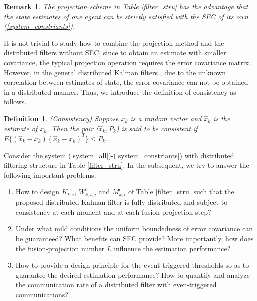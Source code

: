 \documentclass[journal,transmag]{IEEEtran}
\newtheorem{definition}{\textbf{Definition}}
\newtheorem{remark}{\textbf{Remark}}
\begin{document}
	

	\begin{remark}
		The projection scheme in Table \ref{filter_stru}  has the advantage that the state estimates of one agent can be
		strictly satisfied with the SEC of its own (\ref{system_constriants}). 
	\end{remark}
	


		It is not trivial to study how to combine the projection method and the distributed filters without SEC, since to obtain an estimate with smaller covariance, the typical projection operation requires the error covariance matrix. 	However, in the general distributed Kalman filters \cite{olfati2009kalman,olfati2007distributed, yang2014stochastic, Dm2015Distributed, cattivelli2010diffusion, Hu2012Diffusion}, due to the unknown correlation between estimates of state,  the error covariance can not be obtained in a distributed manner.  
	Thus, we introduce the definition of consistency  as follows.
	\begin{definition}\cite{Julier1997A}\label{def_consis}
		(Consistency) Suppose $x_{k}$ is a random vector and $\hat x_{k}$ is the estimate of $x_{k}$. Then the pair ($\hat x_{k},P_{k}$) is said to be consistent  if $E\{(\hat x_{k}-x_{k})(\hat x_{k}- x_{k})^T\}\leq P_{k}.$
	\end{definition}
	 
	Consider the system (\ref{system_all})-(\ref{system_constriants}) with distributed filtering structure in Table \ref{filter_stru}.
	 In the subsequent, we try to answer the following important problems:
	\begin{enumerate}
		\item How to design $K_{k,i}$, $W_{k,i,j}^l$ and $M_{k,i}^l$ of Table \ref{filter_stru} such that the proposed distributed Kalman filter is fully distributed  and subject to consistency at each moment and at each fusion-projection step?
		\item Under what mild conditions the uniform boundedness of error covariance can be guaranteed?		
		What benefits can SEC  provide? More importantly, how does the fusion-projection number $L$ influence the estimation performance?
		\item How to provide a design principle for the event-triggered thresholds so as to guarantee the desired estimation performance? How to quantify and analyze the communication rate of a distributed filter with even-triggered communications?
	\end{enumerate}
	
\end{document}
